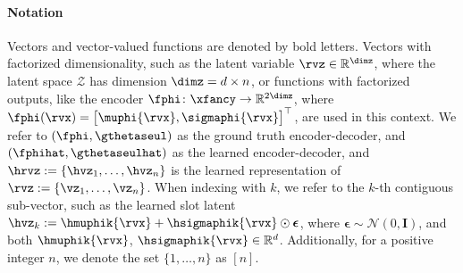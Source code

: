 \documentclass{article} %
\theoremstyle{plain}
\theoremstyle{definition}
\theoremstyle{remark}
\numberwithin{equation}{section}
\begin{document}
\begin{enumerate}[label={[{\color{gray!100}\arabic*}]}, leftmargin=*]
\end{enumerate}

\paragraph{Notation} Vectors and vector-valued functions are denoted by bold letters. Vectors with factorized dimensionality, such as the latent variable $\rvz \in \mathbb{R}^{\dimz}$, where the latent space $\mathcal{Z}$ has dimension $\dimz = d \times n$, or functions with factorized outputs, like the encoder $\fphi\colon \xfancy \to \mathbb{R}^{2\dimz}$, where $\fphi(\rvx) = \begin{bmatrix} \muphi{\rvx}, \sigmaphi{\rvx} \end{bmatrix}^\top$, are used in this context. We refer to $(\fphi, \gthetaseul)$ as the ground truth encoder-decoder, and $(\fphihat, \gthetaseulhat)$ as the learned encoder-decoder, and $\hrvz:=\{\hvz_1, \dots, \hvz_n\}$ is the learned representation of $\rvz:=\{\vz_1, \dots, \vz_n\}$. When indexing with $k $, we refer to the $k $-th contiguous sub-vector, such as the learned slot latent $\hvz_k := \hmuphik{\rvx} + \hsigmaphik{\rvx} \odot \boldsymbol{\epsilon} $, where $\boldsymbol{\epsilon} \sim \mathcal{N}(0, \mathbf{I})$, and both $\hmuphik{\rvx}$, $\hsigmaphik{\rvx} \in \mathbb{R}^{d}$. Additionally, for a positive integer $n $, we denote the set $\{1, \ldots, n\} $ as $[n] $. 



\end{document}
